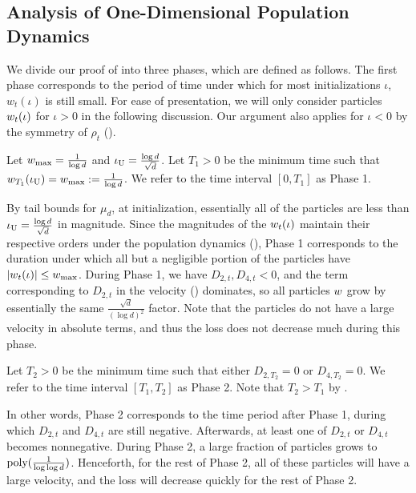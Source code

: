 \subsection{Analysis of One-Dimensional Population Dynamics} \label{sec:population_loss}

We divide our proof of  into three phases, which are defined as follows. The first phase corresponds to the period of time under which for most initializations $\iota$, $w_t(\iota)$ is still small. For ease of presentation, we will only consider particles $w_t(\iota)$ for $\iota > 0$ in the following discussion. Our argument also applies for $\iota < 0$ by the symmetry of $\rho_t$ ().

\begin{definition}[Phase 1] \label{def:phase_1}
Let ${w_{\textup{max}}} = \frac{1}{\log d}$ and $\iota_{\textup{U}} = \frac{\log d}{\sqrt{d}}$. Let $T_1 > 0$ be the minimum time such that $w_{T_1}(\iota_{\textup{U}}) = {w_{\textup{max}}} := \frac{1}{\log d}$. We refer to the time interval $[0, T_1]$ as Phase 1.
\end{definition}

By tail bounds for $\mu_d$, at initialization, essentially all of the particles are less than $\iota_{\textup{U}} = \frac{\log d}{\sqrt{d}}$ in magnitude. Since the magnitudes of the $w_t(\iota)$ maintain their respective orders under the population dynamics (), Phase 1 corresponds to the duration under which all but a negligible portion of the particles have $|w_t(\iota)| \leq {w_{\textup{max}}}$. During Phase 1, we have $D_{2,t}, D_{4, t} < 0$, and the term corresponding to $D_{2, t}$ in the velocity () dominates, so all particles $w$ grow by essentially the same $\frac{\sqrt{d}}{(\log d)^2}$ factor. Note that the particles do not have a large velocity in absolute terms, and thus the loss does not decrease much during this phase.


\begin{definition}[Phase 2] \label{def:phase_2}
Let $T_2 > 0$ be the minimum time such that either $D_{2, T_2} = 0$ or $D_{4, T_2} = 0$. We refer to the time interval $[T_1, T_2]$ as Phase 2. Note that $T_2 > T_1$ by .
\end{definition}

In other words, Phase 2 corresponds to the time period after Phase 1, during which $D_{2, t}$ and $D_{4, t}$ are still negative. Afterwards, at least one of $D_{2, t}$ or $D_{4, t}$ becomes nonnegative. During Phase 2, a large fraction of particles grows to $\textup{poly}(\frac{1}{\log \log d})$. Henceforth, for the rest of Phase 2, all of these particles will have a large velocity, and the loss will decrease quickly for the rest of Phase 2.

